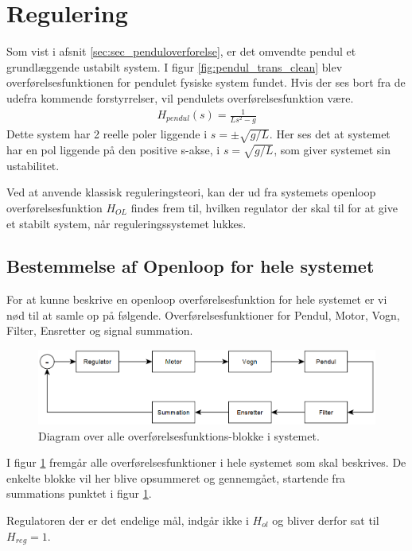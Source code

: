 \section{Regulering}\label{sec:regulering}

Som vist i afsnit \ref{sec:sec_penduloverforelse}, er det omvendte pendul et grundlæggende ustabilt system.
I figur \ref{fig:pendul_trans_clean} blev overførelsesfunktionen for pendulet fysiske system fundet.
Hvis der ses bort fra de udefra kommende forstyrrelser, vil pendulets overførelsesfunktion være.
\begin{align}
H_{pendul}(s) = \frac{1}{Ls^2 - g} \label{eq:h_pendul}
\end{align} 
Dette system har 2 reelle poler liggende i $s = \pm\sqrt{g/L}$.
Her ses det at systemet har en pol liggende på den positive s-akse, i $s = \sqrt{g/L}$, som giver systemet sin ustabilitet.

Ved at anvende klassisk reguleringsteori, kan der ud fra systemets openloop overførelsesfunktion $H_{OL}$ findes frem til, hvilken regulator der skal til for at give et stabilt system, når reguleringssystemet lukkes.   

\subsection{Bestemmelse af Openloop for hele systemet}
For at kunne beskrive en openloop overførelsesfunktion for hele systemet er vi nød til at samle op på følgende.
Overførelsesfunktioner for Pendul, Motor, Vogn, Filter, Ensretter og signal summation.
\begin{figure}[h!]
	\centering
	\includegraphics[width=.8\textwidth]{billeder/reg_diagram.png}
	\caption{Diagram over alle overførelsesfunktions-blokke i systemet.}
	\label{fig:reg_diagram}
\end{figure}
\FloatBlock 

I figur \ref{fig:reg_diagram} fremgår alle overførelsesfunktioner i hele systemet som skal beskrives.
De enkelte blokke vil her blive opsummeret og gennemgået, startende fra summations punktet i figur \ref{fig:reg_diagram}.

Regulatoren der er det endelige mål, indgår ikke i $H_{ol}$ og bliver derfor sat til $H_{reg} = 1$.   

